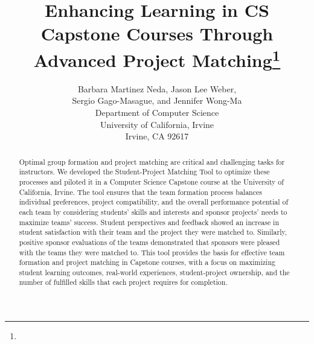 \documentclass{article}
\title{Enhancing Learning in CS Capstone Courses Through Advanced Project Matching\footnote{\protect}
}
\author{
Barbara Martinez Neda, Jason Lee Weber,\\ Sergio Gago-Masague, and Jennifer Wong-Ma\\
Department of Computer Science\\
University of California, Irvine\\
Irvine, CA 92617\\
\email{\{barbarm,weberjl,sgagomas,jwongma\}@uci.edu}}
\begin{document}
\maketitle
\thispagestyle{empty}
\pagestyle{empty}

\begin{abstract}

Optimal group formation and project matching are critical and challenging tasks for instructors.
We developed the Student-Project Matching Tool to optimize these processes and piloted it in a Computer Science Capstone course at the University of California, Irvine. The tool ensures that the team formation process balances individual preferences, project compatibility, and the overall performance potential of each team by considering students' skills and interests and sponsor projects' needs to maximize teams' success.
Student perspectives and feedback showed an increase in student satisfaction with their team and the project they were matched to. Similarly, positive sponsor evaluations of the teams demonstrated that sponsors were pleased with the teams they were matched to.
This tool provides the basis for effective team formation and project matching in Capstone courses, with a focus on maximizing student learning outcomes, real-world experiences, student-project ownership, and the number of fulfilled skills that each project requires for completion.


\end{abstract}










\medskip

\printbibliography
\end{document}
